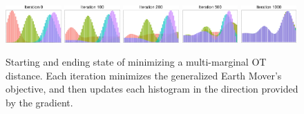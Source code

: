 \begin{figure}[t]
    \centering
    \includegraphics[width=0.19\textwidth]{6_demd/figs/hists/hists_iter_0.pdf}
    \includegraphics[width=0.19\textwidth]{6_demd/figs/hists/hists_iter_100.pdf}
    \includegraphics[width=0.19\textwidth]{6_demd/figs/hists/hists_iter_200.pdf}
    \includegraphics[width=0.19\textwidth]{6_demd/figs/hists/hists_iter_500.pdf}
    \includegraphics[width=0.19\textwidth]{6_demd/figs/hists/hists_iter_1000.pdf}
    \caption{\footnotesize Starting and ending state of minimizing a multi-marginal OT distance. Each iteration minimizes the generalized Earth Mover's objective, and then updates each histogram in the direction provided by the gradient.}
    \label{fig:hists}
    \vspace{-10pt}
\end{figure}

